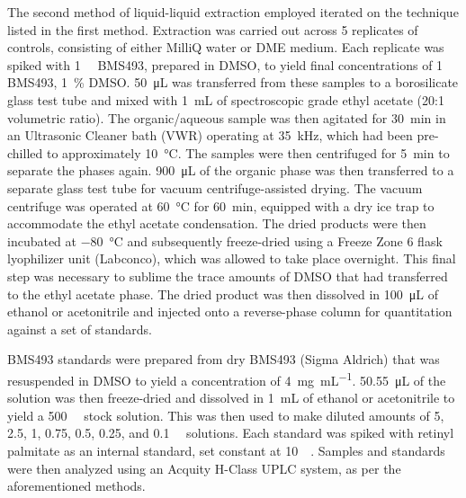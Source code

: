 \begin{refsection}
The second method of liquid-liquid extraction employed iterated on the technique
listed in the first method. Extraction was carried out across 5 replicates of
controls, consisting of either MilliQ water or DME medium. Each replicate was
spiked with \SI{1}{\milli\moLar} BMS493, prepared in DMSO, to yield final
concentrations of \SI{1}{\micro\moLar} BMS493, \SI{1}{\percent} DMSO.
\SI{50}{\uL} was transferred from these samples to a borosilicate glass test
tube and mixed with \SI{1}{\mL} of spectroscopic grade ethyl acetate (20:1
volumetric ratio). The organic/aqueous sample was then agitated for
\SI{30}{\minute} in an Ultrasonic Cleaner bath (VWR) operating at
\SI{35}{\kilo\hertz}, which had been pre-chilled to
approximately \SI{10}{\celsius}. The samples were then centrifuged for
\SI{5}{\minute} to separate the phases again. \SI{900}{\uL} of the organic phase
was then transferred to a separate glass test tube for vacuum
centrifuge-assisted drying.  The vacuum centrifuge was operated at
\SI{60}{\celsius} for \SI{60}{\minute}, equipped with a dry ice trap to
accommodate the  ethyl acetate condensation. The dried products were then
incubated at \SI{-80}{\celsius} and subsequently freeze-dried using a Freeze
Zone 6 flask lyophilizer unit (Labconco), which was allowed to take place
overnight. This final step was necessary to sublime the trace amounts of DMSO
that had transferred to the ethyl acetate phase. The dried product was then
dissolved in \SI{100}{\uL} of ethanol or acetonitrile and injected onto a
 reverse-phase column for quantitation against a set of standards.

BMS493 standards were prepared from dry BMS493 (Sigma Aldrich) that was
resuspended in DMSO to yield a concentration of \SI{4}{\mg\per\mL}.
\SI{50.55}{\uL} of the solution was then freeze-dried and dissolved in
\SI{1}{\mL} of ethanol or acetonitrile to yield a \SI{500}{\micro\moLar} stock
solution. This was then used to make diluted amounts of 5, 2.5, 1, 0.75, 0.5,
0.25, and \SI{0.1}{\micro\moLar} solutions. Each standard was spiked with retinyl
palmitate as an internal standard, set constant at \SI{10}{\micro\moLar}.
Samples and standards were then analyzed using an Acquity H-Class UPLC system,
as per the aforementioned methods.



\end{refsection}
